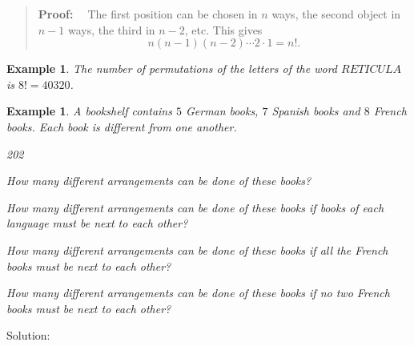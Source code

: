 \documentclass[11pt, openany]{book}
\theoremstyle{change} \theoremheaderfont{\blue\sffamily\bfseries}
\newtheorem{exa}[thm]{Example}
\newcommand{\proofsymbol}{\Pisymbol{pzd}{113}}
\theoremstyle{nonumberplain} \theoremheaderfont{\sffamily\bfseries}
\newenvironment{pf}[0]{\itshape\begin{quote}{\bf Proof: \ }}{\proofsymbol\end{quote}}
\newcommand{\í}{\'{\i}}
\begin{document}
\begin{pf}
The first position can be chosen in $n$ ways, the second object in
$n - 1$ ways, the third in $n - 2$, etc. This gives $$n(n-1)(n-2)
\cdots 2\cdot 1 = n!.
$$
\end{pf}
\begin{exa}
The number of permutations of the letters of the word $RETICULA$ is
$8! = 40320$.
\end{exa}
\begin{exa}
A bookshelf contains $5$ German books, $7$ Spanish books and $8$
French books. Each book is different from one another.
\begin{multicols}{2}\columnseprule 1pt \columnsep 25pt
\begin{dingautolist}{202}
\item  How many different arrangements can be done of these books?
\item How many different arrangements can be done of these books
if books of each language must be next to each other? \item How many
different arrangements can be done of these books if all the French
books must be next to each other? \item How many different
arrangements can be done of these books if no two French books must
be next to each other?
\end{dingautolist}
\end{multicols}
\end{exa}
Solution:
\end{document}
